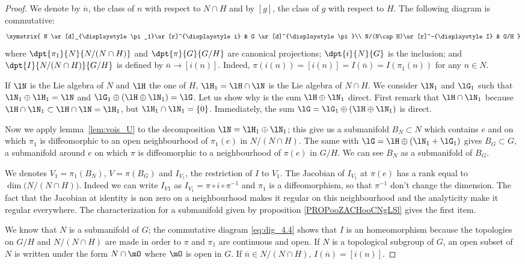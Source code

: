 \begin{proof}
We denote by $\overline{n}$, the class of $n$ with respect to $N\cap H$ and by $[g]$, the class of $g$ with respect to $H$.
The following diagram is commutative:
\begin{equation}\label{eq:dig_4.4}
 \xymatrix{
    N  \ar[d]_{\displaystyle\pi_1}\ar[r]^{\displaystyle i} &  G \ar[d]^{\displaystyle\pi}\\
    N/(N\cap H)\ar[r]^-{\displaystyle I} &       G/H
  }
\end{equation}
where $\dpt{\pi_1}{N}{N/(N\cap H)}$ and $\dpt{\pi}{G}{G/H}$ are canonical projections; $\dpt{i}{N}{G}$ is the inclusion; and $\dpt{I}{N/(N\cap H)}{G/H}$ is defined by $\overline{n}\to [i(n)]$. Indeed, $\pi(i(n))=[i(n)]=I( \overline{n} )=I(\pi_1(n))$ for any $n\in N$.

If $\lN$ is the Lie algebra of $N$ and $\lH$ the one of $H$, $\lH_1=\lH\cap\lN$ is the Lie algebra of $N\cap H$. We consider $\lN_1$ and  $\lG_1$ such that $\lN_1\oplus\lH_1=\lN$ and $\lG_1\oplus(\lH\oplus\lN_1)=\lG$. Let us show why is the sum $\lH\oplus\lN_1$ direct. First remark that $\lH\cap\lN_1$ because $\lH\cap\lN_1\subset\lH\cap\lN=\lH_1$, but $\lH_1\cap\lN_1=\{0\}$. Immediately, the sum $\lG=\lG_1\oplus(\lH\oplus\lN_1)$ is direct.

Now we apply lemma~\ref{lem:vois_U} to the decomposition $\lN=\lH_1\oplus\lN_1$; this give us a submanifold $B_N\subset N$ which contains $e$ and on which $\pi_1$ is diffeomorphic to an open neighbourhood of $\pi_1(e)$ in $N/(N\cap H)$. The same with $\lG=\lH\oplus(\lN_1+\lG_1)$ gives $B_G\subset G$, a submanifold around $e$ on which $\pi$ is diffeomorphic to a neighbourhood of $\pi(e)$ in $G/H$. We can see $B_N$ as a submanifold of $B_G$.

We denotes $V_1=\pi_1(B_N)$, $V=\pi(B_G)$ and $I_{V_1}$, the restriction of $I$ to $V_1$. The Jacobian of $I_{V_1}$ at $\pi(e)$ has a rank equal to $\dim\big( N/(N\cap H) \big)$. Indeed we can write $I_{V1}$ as $I_{V_1}=\pi\circ i\circ\pi^{-1}$ and $\pi_1$ is a diffeomorphism, so that $\pi^{-1}$ don't change the dimension. The fact that the Jacobian at identity is non zero on a neighbourhood makes it regular on this neighbourhood and the analyticity make it regular everywhere. The characterization for a submanifold given by proposition \ref{PROPooZACHooCNgLSl} gives the first item.

We know that $N$ is a submanifold of $G$; the commutative diagram \eqref{eq:dig_4.4} shows that $I$ is an homeomorphism because the topologies on $G/H$ and $N/(N\cap H)$ are made in order to $\pi$ and $\pi_1$ are continuous and open. If $N$ is a topological subgroup of $G$, an open subset of $N$ is written under the form $N\cap\mO$ where $\mO$ is open in $G$. If $\overline{n}\in N/(N\cap H)$, $I(\overline{n})=[i(n)]$.


\end{proof}
